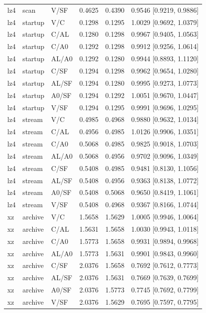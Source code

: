 \begin{longtable}{lllrrl}
lz4 & scan & V/SF & 0.4625 & 0.4390 & 0.9546 [0.9219, 0.9886] \\
lz4 & startup & V/C & 0.1298 & 0.1295 & 1.0029 [0.9692, 1.0379] \\
lz4 & startup & C/AL & 0.1280 & 0.1298 & 0.9967 [0.9405, 1.0563] \\
lz4 & startup & C/A0 & 0.1292 & 0.1298 & 0.9912 [0.9256, 1.0614] \\
lz4 & startup & AL/A0 & 0.1292 & 0.1280 & 0.9944 [0.8893, 1.1120] \\
lz4 & startup & C/SF & 0.1294 & 0.1298 & 0.9962 [0.9654, 1.0280] \\
lz4 & startup & AL/SF & 0.1294 & 0.1280 & 0.9995 [0.9273, 1.0773] \\
lz4 & startup & A0/SF & 0.1294 & 0.1292 & 1.0051 [0.9670, 1.0447] \\
lz4 & startup & V/SF & 0.1294 & 0.1295 & 0.9991 [0.9696, 1.0295] \\
lz4 & stream & V/C & 0.4985 & 0.4968 & 0.9880 [0.9632, 1.0134] \\
lz4 & stream & C/AL & 0.4956 & 0.4985 & 1.0126 [0.9906, 1.0351] \\
lz4 & stream & C/A0 & 0.5068 & 0.4985 & 0.9825 [0.9018, 1.0703] \\
lz4 & stream & AL/A0 & 0.5068 & 0.4956 & 0.9702 [0.9096, 1.0349] \\
lz4 & stream & C/SF & 0.5408 & 0.4985 & 0.9481 [0.8130, 1.1056] \\
lz4 & stream & AL/SF & 0.5408 & 0.4956 & 0.9363 [0.8138, 1.0772] \\
lz4 & stream & A0/SF & 0.5408 & 0.5068 & 0.9650 [0.8419, 1.1061] \\
lz4 & stream & V/SF & 0.5408 & 0.4968 & 0.9367 [0.8166, 1.0744] \\
xz & archive & V/C & 1.5658 & 1.5629 & 1.0005 [0.9946, 1.0064] \\
xz & archive & C/AL & 1.5631 & 1.5658 & 1.0030 [0.9943, 1.0118] \\
xz & archive & C/A0 & 1.5773 & 1.5658 & 0.9931 [0.9894, 0.9968] \\
xz & archive & AL/A0 & 1.5773 & 1.5631 & 0.9901 [0.9843, 0.9960] \\
xz & archive & C/SF & 2.0376 & 1.5658 & 0.7692 [0.7612, 0.7773] \\
xz & archive & AL/SF & 2.0376 & 1.5631 & 0.7669 [0.7639, 0.7699] \\
xz & archive & A0/SF & 2.0376 & 1.5773 & 0.7745 [0.7692, 0.7799] \\
xz & archive & V/SF & 2.0376 & 1.5629 & 0.7695 [0.7597, 0.7795] \\

\end{longtable}
